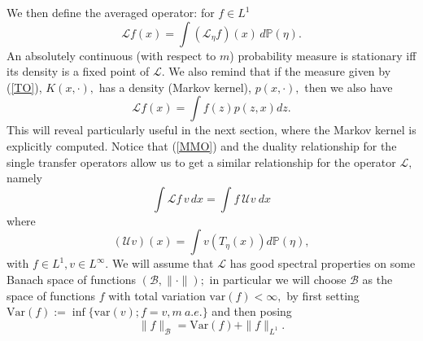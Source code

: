 \documentclass{article}
\newcommand{\cL}{\mathcal{L}}
\newcommand{\PP}{\mathbb P}
\newcommand{\1}{\mathbbm{1}}
\newcommand{\B}{\mathcal B}
\begin{document}
 We then define the averaged operator: for $f\in L^1$
\begin{equation}\label{MMO}
    \mathcal{L}f(x) = \int (\mathcal{L}_{\eta}f)(x)\,d\PP(\eta).
\end{equation}
An absolutely continuous (with respect to $m$) probability measure is stationary iff its density is a fixed point of $\cL.$ We also remind that if the measure given by (\ref{TO}), $K(x, \cdot),$ has a density (Markov kernel), $p(x,\cdot),$ then we also have
\begin{equation}\label{MK}
 \mathcal{L}f(x)=\int f(z) p(z,x)dz.
\end{equation}
This will reveal particularly useful in the next section, where the Markov kernel is explicitly computed. Notice that (\ref{MMO}) and  the duality relationship for the single transfer operators allow us to get a similar relationship for the operator $\cL,$ namely
$$
\int\mathcal{L}f\,v\,dx=\int f\ 
\mathcal{U}v \ dx$$ where 
\begin{equation*}
    (\mathcal{U}v)(x) = \int v(T_{\eta}(x))d\PP(\eta),
\end{equation*}
with $f \in L^1, v \in L^{\infty}.
$
We will assume that $\cL$ has good spectral properties on some Banach space of functions $(\B, \|\cdot\|);$ in particular we will choose  $\B$ as  the space of functions $f$ with total variation $\text{var}(f)<\infty,$ by first setting $\text{Var}(f):=\inf\{\text{var}(v); f=v, m\ a.e.\}$ and then posing
$$
\|f\|_{\B}=\text{Var}(f)+\|f\|_{L^1}.
$$
\end{document}
